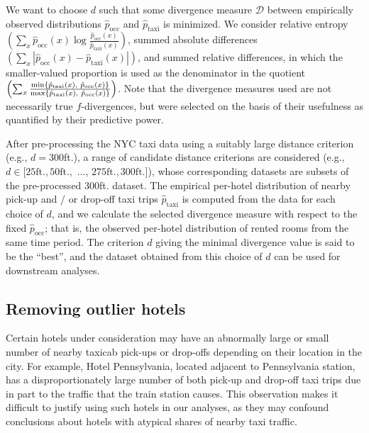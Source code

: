 \documentclass[useAMS, referee, usenatbib]{biom}
\begin{document}
We want to choose $d$ such that some divergence measure $\mathcal{D}$ between empirically observed distributions $\hat{p}_{\mathrm{occ}}$ and $\hat{p}_{\mathrm{taxi}}$ is minimized. We consider relative entropy $\left( \sum_x \hat{p}_{\mathrm{occ}} (x) \log \frac{\hat{p}_{\mathrm{occ}} (x)}{\hat{p}_{\mathrm{taxi}} (x)} \right)$, summed absolute differences $\left( \sum_x | \hat{p}_{\mathrm{occ}} (x) - \hat{p}_{\mathrm{taxi}} (x) | \right)$, and summed relative differences, in which the smaller-valued proportion is used as the denominator in the quotient $\left( \sum_x \frac{\min \{ \hat{p}_{\mathrm{taxi}} (x), \hspace*{0.1cm} \hat{p}_{\mathrm{occ}} (x) \}}{\max \{ \hat{p}_{\mathrm{taxi}} (x), \hspace*{0.1cm} \hat{p}_{\mathrm{occ}} (x) \}} \right)$. Note that the divergence measures used are not necessarily true $f$-divergences, but were selected on the basis of their usefulness as quantified by their predictive power. 

After pre-processing the NYC taxi data using a suitably large distance criterion (e.g., $d = 300$ft.), a range of candidate distance criterions are considered (e.g., $d \in [25 \mathrm{ft.}, 50 \mathrm{ft.},$ ..., $275 \mathrm{ft.}, 300 \mathrm{ft.}]$), whose corresponding datasets are subsets of the pre-processed 300ft. dataset. The empirical per-hotel distribution of nearby pick-up and / or drop-off taxi trips $\hat{p}_{\mathrm{taxi}}$ is computed from the data for each choice of $d$, and we calculate the selected divergence measure with respect to the fixed $\hat{p}_{\mathrm{occ}}$; that is, the observed per-hotel distribution of rented rooms from the same time period. The criterion $d$ giving the minimal divergence value is said to be the ``best'', and the dataset obtained from this choice of $d$ can be used for downstream analyses.

\subsection{Removing outlier hotels}

Certain hotels under consideration may have an abnormally large or small number of nearby taxicab pick-ups or drop-offs depending on their location in the city. For example, Hotel Pennsylvania, located adjacent to Pennsylvania station, has a disproportionately large number of both pick-up and drop-off taxi trips due in part to the traffic that the train station causes. This observation makes it difficult to justify using such hotels in our analyses, as they may confound conclusions about hotels with atypical shares of nearby taxi traffic.
\end{document}

